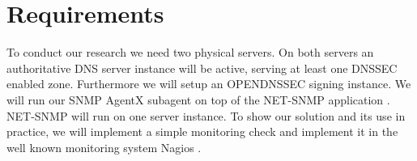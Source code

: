 \section{Requirements}
\label{chap:Requirements}
To conduct our research we need two physical servers. On both servers an authoritative DNS server instance will be active, serving at least one DNSSEC enabled zone. Furthermore we will setup an OPENDNSSEC signing instance. We will run our SNMP AgentX subagent on top of the NET-SNMP application \cite{net-snmp}. NET-SNMP will run on one server instance. To show our solution and its use in practice, we will implement a simple monitoring check and implement it in the well known monitoring system Nagios \cite{nagios}.   

